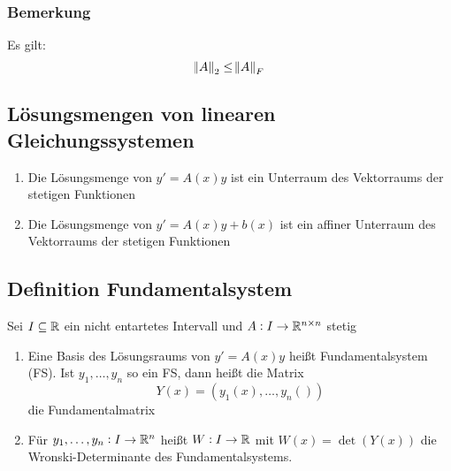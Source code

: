 \subsubsection{Bemerkung}
Es gilt:
\begin{equation*}
	\norm{A}_2 \leq \norm{A}_F
\end{equation*}

\subsection{Lösungsmengen von linearen Gleichungssystemen}
\begin{enumerate}[label= (\alph*)]
	\item Die Lösungsmenge von $y' = A(x) y$ ist ein Unterraum des Vektorraums der stetigen Funktionen
	\item Die Lösungsmenge von $y' = A(x) y + b(x)$ ist ein affiner Unterraum des Vektorraums der stetigen Funktionen
\end{enumerate}

\subsection{Definition Fundamentalsystem}
Sei $I \subseteq \mathbb{R}$ ein nicht entartetes Intervall und $A: I \to \mathbb{R}^{n \times n}$ stetig
\begin{enumerate}[label= (\alph*)]
	\item Eine Basis des Lösungsraums von $y' = A(x) y$ heißt Fundamentalsystem (FS). Ist $y_1, \ldots, y_n$ so ein FS,
		dann heißt die Matrix 
		\begin{equation*}
			Y(x) = (y_1(x), \ldots, y_n())
		\end{equation*}
		die Fundamentalmatrix
	\item Für $y_1, \ldots, y_n: I \to \mathbb{R}^n$ heißt $W: I \to \mathbb{R}$ mit $W(x) = \det (Y(x))$ die Wronski-Determinante
		des Fundamentalsystems.
\end{enumerate}

